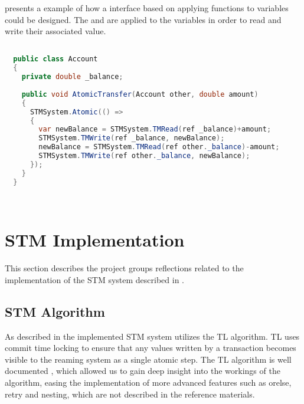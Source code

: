  presents a example of how a  interface based on applying functions to variables could be designed. The  and  are applied to the  variables in order to read and write their associated value. 

\begin{lstlisting}[float,label=lst:lib_function_interface,
  caption={\ac{STM} library interfaced based on applying functions},
  language=Java,  
  showspaces=false,
  showtabs=false,
  breaklines=true,
  showstringspaces=false,
  breakatwhitespace=true,
  escapechar=~,
  commentstyle=\color{greencomments},
  keywordstyle=\color{bluekeywords},
  stringstyle=\color{redstrings},
  morekeywords={atomic, retry, orelse, var, get, set, ref, out}]  % Start your code-block

  public class Account
  {
  	private double _balance;
  	
    public void AtomicTransfer(Account other, double amount)
    {
      STMSystem.Atomic(() =>
      {
      	var newBalance = STMSystem.TMRead(ref _balance)+amount;
      	STMSystem.TMWrite(ref _balance, newBalance);
      	newBalance = STMSystem.TMRead(ref other._balance)-amount;
      	STMSystem.TMWrite(ref other._balance, newBalance);
      });
    }
  }

  
\end{lstlisting}
 
\section{STM Implementation}\label{sec:reflection_stm_implementation}
This section describes the project groups reflections related to the implementation of the \ac{STM} system described in .

\subsection{STM Algorithm}
As described in  the implemented \ac{STM} system utilizes the TL algorithm\cite{dice2006transactional}. TL uses commit time locking to ensure that any values written by a transaction becomes visible to the reaming system as a single atomic step. The TL algorithm is well documented \cite{dice2006transactional}\cite[p. 438]{herlihy2012art}\cite[p. 106]{harris2010transactional}, which allowed us to gain deep insight into the workings of the algorithm, easing the implementation of more advanced features such as orelse, retry and nesting, which are not described in the reference materials.

